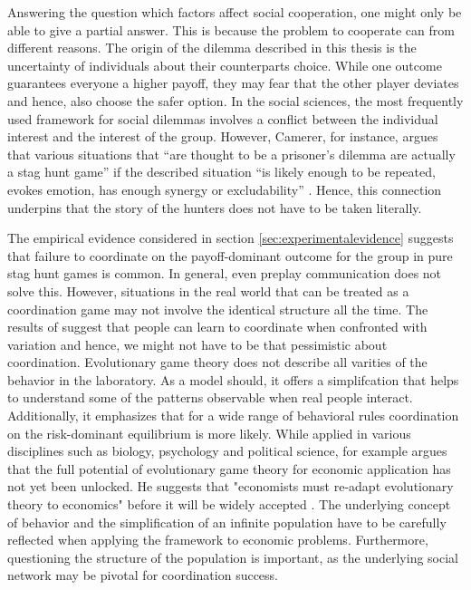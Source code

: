 
Answering the question which factors affect social cooperation, one might
only be able to give a partial answer. This is because the problem to cooperate
can from different reasons.
The origin of the dilemma described in this thesis is the uncertainty 
of individuals about their counterparts choice. 
While one outcome guarantees everyone a higher 
payoff, they may fear that the other player deviates and hence, also choose 
the safer option. 
In the social sciences, the most frequently used framework for social dilemmas
involves a conflict between the individual interest and the interest of 
the group.
However, Camerer, for instance, argues that various situations that 
``are thought to be a prisoner's 
dilemma are actually a stag hunt game'' 
if the described situation ``is likely enough to be repeated, evokes emotion, 
has enough synergy or excludability'' 
\parencite[376-377]{camerer_behavioral_2003}. 
Hence, this connection underpins that the story of the hunters does not have
to be taken literally.

The empirical evidence considered in section \ref{sec:experimentalevidence}
suggests that failure to coordinate on the payoff-dominant 
outcome for the group in pure stag hunt games is common. 
In general, even preplay communication does not solve this.
However, situations in the real world that can be treated as a coordination
game may not involve the identical structure all the time. The
results of \textcite{rankin_strategic_2000} suggest that people can learn 
to coordinate when confronted with variation and hence, we might not
have to be that pessimistic about coordination.
Evolutionary game theory does not describe all varities of the 
behavior in the laboratory. As a model should, it offers a simplifcation
that helps to understand some of the patterns observable when real people
interact. Additionally, it emphasizes that for a wide range
of behavioral rules coordination on the risk-dominant equilibrium
is more likely. While applied in various disciplines such as biology, 
psychology and political science, for example 
\textcite{friedman_economic_1998} argues that the full potential
of evolutionary game theory for economic application 
has not yet been unlocked. He suggests that "economists must re-adapt
evolutionary theory to economics" before it will be widely accepted 
\parencite[18]{friedman_economic_1998}. The underlying concept of behavior and
the simplification of an infinite population have to be carefully reflected
when applying the framework to economic problems. Furthermore, questioning
the structure of the population is important, as the underlying social
network may be pivotal for coordination success.
